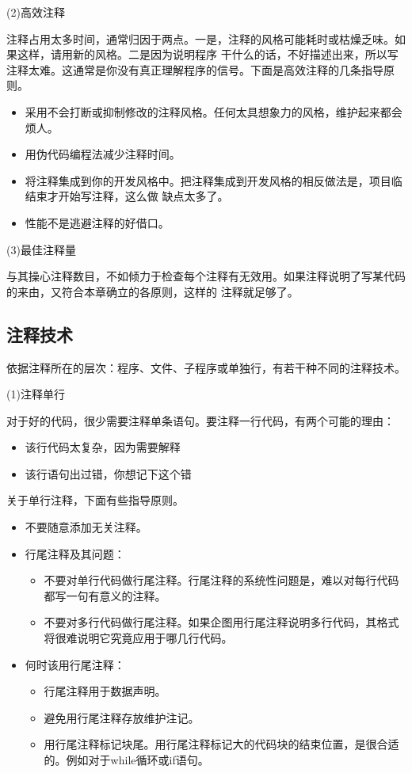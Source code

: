 \documentclass{article}
\begin{document}
\par
(2)高效注释
\par
注释占用太多时间，通常归因于两点。一是，注释的风格可能耗时或枯燥乏味。如果这样，请用新的风格。二是因为说明程序
干什么的话，不好描述出来，所以写注释太难。这通常是你没有真正理解程序的信号。下面是高效注释的几条指导原则。
\begin{itemize}
    \item 采用不会打断或抑制修改的注释风格。任何太具想象力的风格，维护起来都会烦人。
    \item 用伪代码编程法减少注释时间。
    \item 将注释集成到你的开发风格中。把注释集成到开发风格的相反做法是，项目临结束才开始写注释，这么做
    缺点太多了。
    \item 性能不是逃避注释的好借口。
\end{itemize}

\par
(3)最佳注释量
\par
与其操心注释数目，不如倾力于检查每个注释有无效用。如果注释说明了写某代码的来由，又符合本章确立的各原则，这样的
注释就足够了。

\subsection{注释技术}
依据注释所在的层次：程序、文件、子程序或单独行，有若干种不同的注释技术。
\par
(1)注释单行
\par
对于好的代码，很少需要注释单条语句。要注释一行代码，有两个可能的理由：
\begin{itemize}
    \item 该行代码太复杂，因为需要解释
    \item 该行语句出过错，你想记下这个错
\end{itemize}
关于单行注释，下面有些指导原则。
\begin{itemize}
    \item 不要随意添加无关注释。
    \item 行尾注释及其问题：
    \begin{itemize}
        \item 不要对单行代码做行尾注释。行尾注释的系统性问题是，难以对每行代码都写一句有意义的注释。
        \item 不要对多行代码做行尾注释。如果企图用行尾注释说明多行代码，其格式将很难说明它究竟应用于哪几行代码。
    \end{itemize}
    \item 何时该用行尾注释：
    \begin{itemize}
        \item 行尾注释用于数据声明。
        \item 避免用行尾注释存放维护注记。
        \item 用行尾注释标记块尾。用行尾注释标记大的代码块的结束位置，是很合适的。例如对于while循环或if语句。
    \end{itemize}
\end{itemize}
\end{document}
